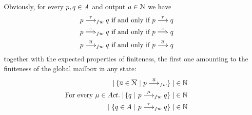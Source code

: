 Obviously, for every $p,q \in A$ and output $a \in \mathcal{N}$ we have
\begin{align}
\label{eq:sta-tau-iff-st-tau}
  \serverA \sta{\tau} \serverB \text{ if and only if } \serverA \st{\tau}   \serverB\\
\label{eq:wta-epsilon-iff-wt-epsilon}
  \serverA \wta{ \varepsilon }  \serverB \text{ if and only if } \serverA \wt{ \varepsilon }  \serverB\\
\label{eq:output-sta-st}
 \serverA \sta{\co{\aa}}  \serverB\text{ if and only if } \serverA \st{\co{\aa}}  \serverB
\end{align}
\noindent
together with the expected properties of finiteness,
the first one amounting to the finiteness of the global mailbox in any state:
\begin{align}
{\cardinality{\setof{ \co{a} \in \co{\Names} }{ p \sta{\co{a}} }}} \in \N
\\
\Forevery \mu \in \Act \wehavethat {\cardinality{\setof{ q }{ p \sta{\mu} q }}} \in \N
\\
  {\cardinality{ %
      \setof{ q \in \States}{p \sta{\tau} q } }} \in \N
\end{align}



